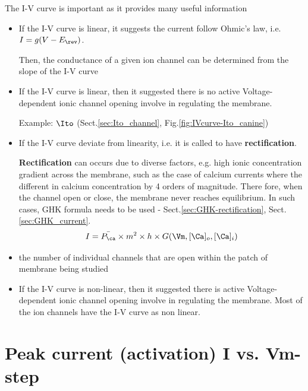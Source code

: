 The I-V curve is important as it provides many useful information
\begin{itemize}

  \item If the I-V curve is linear, it suggests the current follow Ohmic's law,
  i.e. $I=g(V-E_\rev)$.

Then, the conductance of a given ion channel can be determined from the slope
of the I-V curve

  \item  If the I-V curve is linear, then it suggested there is no active
  Voltage-dependent ionic channel opening involve in regulating the membrane.


Example: $\Ito$ (Sect.\ref{sec:Ito_channel}, Fig.\ref{fig:IVcurve-Ito_canine})

  \item If the I-V curve deviate from linearity, i.e. it is called to have {\bf
  rectification}.

{\bf Rectification} can occurs due to diverse factors, e.g. high ionic
concentration gradient across the membrane, such as the case of calcium currents
where the different in calcium concentration by 4 orders of magnitude. There
fore, when the channel open or close, the membrane never reaches equilibrium. In
such cases, GHK formula needs to be used - Sect.\ref{sec:GHK-rectification},
Sect.\ref{sec:GHK_current}.
\begin{equation}
I = \bar{P_\ca} \times m^2 \times h \times G(\Vm, [\Ca]_o, [\Ca]_i)
\end{equation}

  \item  the number of individual channels that are open within the patch of
  membrane being studied

  \item If the I-V curve is non-linear, then it suggested there is active
  Voltage-dependent ionic channel opening involve in regulating the membrane.
  Most of the ion channels have the I-V curve as non linear.

\end{itemize}

\section{Peak current (activation) I vs. Vm-step}
\label{sec:I-V-curve-peak-current}

